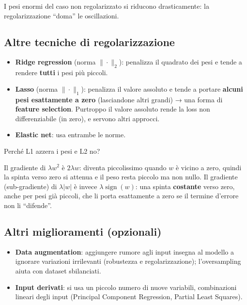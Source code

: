 I pesi enormi del caso non regolarizzato si riducono drasticamente: la
regolarizzazione ``doma'' le oscillazioni.

\subsection{Altre tecniche di
regolarizzazione}\label{altre-tecniche-di-regolarizzazione}

\begin{itemize}
\tightlist
\item
  \textbf{Ridge regression} (norma \(\|\cdot\|_2\)): penalizza il
  quadrato dei pesi e tende a rendere \textbf{tutti} i pesi più piccoli.
\item
  \textbf{Lasso} (norma \(\|\cdot\|_1\)): penalizza il valore assoluto e
  tende a portare \textbf{alcuni pesi esattamente a zero} (lasciandone
  altri grandi) → una forma di \textbf{feature selection}. Purtroppo il
  valore assoluto rende la loss non differenziabile (in zero), e servono
  altri approcci.
\item
  \textbf{Elastic net}: usa entrambe le norme.
\end{itemize}

\begin{boxtip}{Perché L1 azzera i pesi e L2 no?}

Il gradiente di \(\lambda w^2\) è \(2\lambda w\): diventa piccolissimo
quando \(w\) è vicino a zero, quindi la spinta verso zero si attenua e
il peso resta piccolo ma non nullo. Il gradiente (sub-gradiente) di
\(\lambda|w|\) è invece \(\lambda\operatorname{sign}(w)\): una spinta
\textbf{costante} verso zero, anche per pesi già piccoli, che li porta
esattamente a zero se il termine d'errore non li ``difende''.

\end{boxtip}

\subsection{Altri miglioramenti
(opzionali)}\label{altri-miglioramenti-opzionali}

\begin{itemize}
\tightlist
\item
  \textbf{Data augmentation}: aggiungere rumore agli input insegna al
  modello a ignorare variazioni irrilevanti (robustezza e
  regolarizzazione); l'oversampling aiuta con dataset sbilanciati.
\item
  \textbf{Input derivati}: si usa un piccolo numero di nuove variabili,
  combinazioni lineari degli input (Principal Component Regression,
  Partial Least Squares).
\end{itemize}

